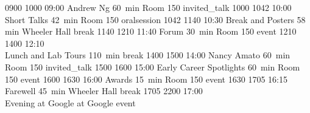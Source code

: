 \begin{timetable}
   {0900} {1000} {09:00 Andrew Ng}                            {60~min}                           {Room 150}                      {invited_talk}
   {1000} {1042} {10:00 Short Talks}                          {\vspace{1.5mm}42~min}             {\vspace{1.5mm}Room 150}        {oralsession}
   {1042} {1140} {10:30 Break and Posters}                    {\vspace{1.5mm}58 min}             {Wheeler Hall}      {break}
   {1140} {1210} {11:40 Forum}                                {\vspace{1.5mm}30~min}             {\vspace{1.5mm}Room 150}                      {event}
   {1210} {1400} {12:10\\[0.2em]Lunch and Lab Tours}          {110~min}                          {}                            {break}
   {1400} {1500} {14:00 Nancy Amato}                          {60~min}                           {Room 150}                      {invited_talk}
   {1500} {1600} {15:00 Early Career Spotlights} 	      {\vspace{1.5mm}60~min}             {\vspace{1.5mm}Room 150}        {event}
   {1600} {1630} {16:00 Awards} 	              {\vspace{1.5mm}15~min}             {\vspace{1.5mm}Room 150}        {event}
   {1630} {1705} {16:15 Farewell} 	              {\vspace{1.5mm}45~min}             {Wheeler Hall}        {break}
   {1705} {2200} {17:00\\\vspace{0.3em}Evening at Google}     {}                              {at Google}     {event}
\end{timetable}






\begingroup %
\sffamily



